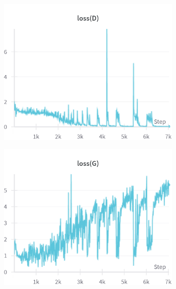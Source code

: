 \begin{figure}[H]
    \centering

    \begin{subfigure}{0.45\textwidth}
        \centering
        \includegraphics[width=0.95\linewidth]{init/lossD.png}
        \caption{}
        \label{subfig:init/lossD}
    \end{subfigure}%
    \begin{subfigure}{0.45\textwidth}
        \centering
        \includegraphics[width=0.95\linewidth]{init/lossG.png}
        \caption{}
        \label{subfig:init/lossG}
    \end{subfigure}


\end{figure}
